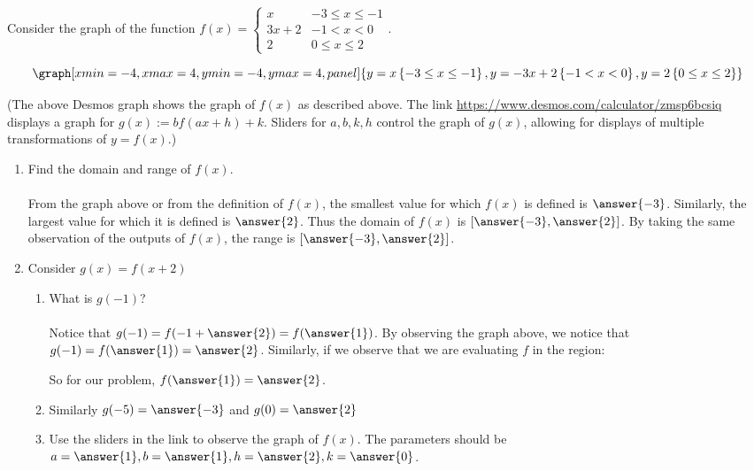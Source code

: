 \documentclass{ximera}
\begin{document}
\begin{question}
Consider the graph of the function $f(x)=\begin{cases}   x & -3\leq x \leq -1 \\ 3x+2 &-1<x<0 \\ 2 & 0\leq x\leq 2\end{cases}.$

 \begin{onlineOnly}
   \[
   \graph[xmin=-4,xmax=4,ymin=-4,ymax=4, panel]{y=x\left\{-3\leq x\leq -1\right\},y=-3x+2\left\{-1<x<0\right\},y=2\left\{0 \leq x\leq 2\right\}} 
   \]
 \end{onlineOnly}
(The above Desmos graph shows the graph of $f(x)$ as described above.  The link \url{https://www.desmos.com/calculator/zmsp6bcsiq} displays a graph for $g(x):=bf(ax+h)+k$.  Sliders for $a,b,k,h$ control the graph of $g(x)$, allowing for displays of multiple transformations of $y=f(x)$.)


\begin{enumerate}
\item Find the domain and range of $f(x)$.\\ \\ From the graph above or from the definition of $f(x)$, the smallest value for which $f(x)$ is defined is $\answer{-3}$.  Similarly, the largest value for which it is defined is $\answer{2}$.  Thus the domain of $f(x)$ is $[\answer{-3}, \answer{2}]$.  By taking the same observation of the outputs of $f(x)$, the range is $[\answer{-3}, \answer{2}]$.

\item Consider $g(x)=f(x+2)$
\begin{enumerate}
\item What is $g(-1)$?  \\ \\ Notice that $g(-1)=f(-1+\answer{2})=f(\answer{1})$.  By observing the graph above, we notice that $g(-1)=f(\answer{1})=\answer{2}$.  Similarly, if we observe that we are evaluating $f$ in the region:

\begin{multipleChoice}
\end{multipleChoice}

So for our problem, $f(\answer{1})=\answer{2}$.

\item Similarly $g(-5)=\answer{-3}$ and $g(0)=\answer{2}$

\item Use the sliders in the link to observe the graph of $f(x)$.  The parameters should be $a=\answer{1}, b=\answer{1}, h=\answer{2}, k=\answer{0}$.


\end{enumerate}
\end{enumerate}
\end{question}
\end{document}

